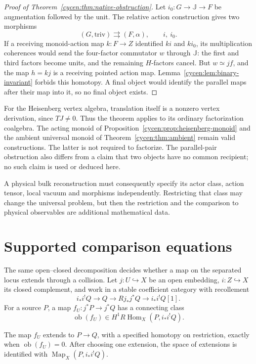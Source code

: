 \begin{proof}[Proof of Theorem~\ref{cycen:thm:native-obstruction}]
Let $i_0:G\to\mathbb J\to F$ be augmentation followed
by the unit. The relative action construction gives
two morphisms
\[
          (G,\mathrm{triv})\rightrightarrows(F,\alpha),
          \qquad i,\ i_0.
\]
If a receiving monoid-action map $k:F\to Z$ identified
$ki$ and $ki_0$, its multiplication coherences would
send the four-factor commutator $w$ through
$\mathbb J$: the first and third factors become
units, and the remaining $H$-factors cancel.
But $w\simeq jf$, and the map $h=kj$ is a receiving
pointed action map. Lemma~\ref{cycen:lem:binary-invariant}
forbids this homotopy. A final object would identify
the parallel maps after their map into it, so no
final object exists.
\end{proof}

For the Heisenberg vertex algebra, translation itself
is a nonzero vertex derivation, since $TJ\ne0$.
Thus the theorem applies to its ordinary factorization
coalgebra. The acting monoid of
Proposition~\ref{cycen:prop:heisenberg-monoid} and the
ambient universal monoid of
Theorem~\ref{cycen:thm:ambient} remain valid constructions.
The latter is not required to factorize. The parallel-pair
obstruction also differs from a claim that two objects
have no common recipient; no such claim is used or
deduced here.

A physical bulk reconstruction must consequently specify
its actor class, action tensor, local vacuum and morphisms
independently. Restricting that class may change the
universal problem, but then the restriction and the
comparison to physical observables are additional
mathematical data.

\section{Supported comparison equations}

The same open--closed decomposition decides whether a
map on the separated locus extends through a collision.
Let \(j:U\hookrightarrow X\) be an open embedding,
\(i:Z\hookrightarrow X\) its closed complement, and
work in a stable coefficient category with recollement
\[
 i_*i^!Q\longrightarrow Q\longrightarrow Rj_*j^*Q
                          \longrightarrow i_*i^!Q[1].
\]
For a source \(P\), a map \(f_U:j^*P\to j^*Q\)
has a connecting class
\[
 \operatorname{ob}(f_U)\in
              H^1R\operatorname{Hom}_X(P,i_*i^!Q).
\]

\begin{proposition}\label{cyp:prop:extension}
The map \(f_U\) extends to \(P\to Q\), with a specified
homotopy on restriction, exactly when
\(\operatorname{ob}(f_U)=0\). After choosing one extension,
the space of extensions is identified with
\(\operatorname{Map}_X(P,i_*i^!Q)\).
\end{proposition}

